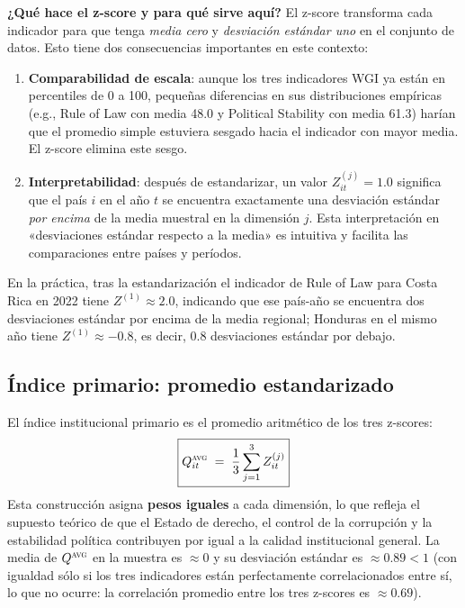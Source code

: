 \documentclass[12pt, a4paper]{article}
\theoremstyle{definition}
\begin{document}
\begin{intuitionbox}
\textbf{¿Qué hace el z-score y para qué sirve aquí?} El z-score transforma cada indicador para que tenga \emph{media cero} y \emph{desviación estándar uno} en el conjunto de datos. Esto tiene dos consecuencias importantes en este contexto:
\begin{enumerate}
  \item \textbf{Comparabilidad de escala}: aunque los tres indicadores WGI ya están en percentiles de 0 a 100, pequeñas diferencias en sus distribuciones empíricas (e.g., Rule of Law con media 48.0 y Political Stability con media 61.3) harían que el promedio simple estuviera sesgado hacia el indicador con mayor media. El z-score elimina este sesgo.
  \item \textbf{Interpretabilidad}: después de estandarizar, un valor $Z^{(j)}_{it} = 1.0$ significa que el país $i$ en el año $t$ se encuentra exactamente una desviación estándar \emph{por encima} de la media muestral en la dimensión $j$. Esta interpretación en «desviaciones estándar respecto a la media» es intuitiva y facilita las comparaciones entre países y períodos.
\end{enumerate}
En la práctica, tras la estandarización el indicador de Rule of Law para Costa Rica en 2022 tiene $Z^{(1)} \approx 2.0$, indicando que ese país-año se encuentra dos desviaciones estándar por encima de la media regional; Honduras en el mismo año tiene $Z^{(1)} \approx -0.8$, es decir, 0.8 desviaciones estándar por debajo.
\end{intuitionbox}

\subsection{Índice primario: promedio estandarizado}
\label{sec:inst_primary}

El índice institucional primario es el promedio aritmético de los tres z-scores:
\[
  \boxed{Q_{it}^{\textsc{avg}} \;=\; \frac{1}{3}\sum_{j=1}^{3} Z^{(j)}_{it}}
\]
Esta construcción asigna \textbf{pesos iguales} a cada dimensión, lo que refleja el supuesto teórico de que el Estado de derecho, el control de la corrupción y la estabilidad política contribuyen por igual a la calidad institucional general. La media de $Q^{\textsc{avg}}$ en la muestra es $\approx 0$ y su desviación estándar es $\approx 0.89 < 1$ (con igualdad sólo si los tres indicadores están perfectamente correlacionados entre sí, lo que no ocurre: la correlación promedio entre los tres z-scores es $\approx 0.69$).
\end{document}
